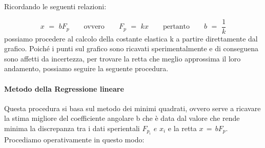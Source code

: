 Ricordando le seguenti relazioni:

\begin{equation}
    x \,\,=\,\, bF_p \qquad \text{ovvero} \qquad F_p \,\,=\,\, kx \qquad \text{pertanto} \qquad b \,\,=\,\, \frac{1}{k}
\end{equation}
%
possiamo procedere al calcolo della costante elastica k a partire direttamente dal grafico. Poiché i punti sul grafico sono ricavati sperimentalmente e di conseguena sono affetti da incertezza, per trovare la retta che meglio approssima il loro andamento, possiamo seguire la seguente procedura.

\paragraph{Metodo della Regressione lineare\\}

Questa procedura si basa sul metodo dei minimi quadrati, ovvero serve a ricavare la stima migliore del coefficiente angolare b che è data dal valore che rende minima la discrepanza tra i dati sperientali $F_{p_i} \,\,e\,\, x_i$ e la retta $x \,=\, bF_p$.\\
Procediamo operativamente in questo modo:

